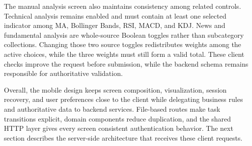 The manual analysis screen also maintains consistency among related controls. Technical analysis remains enabled and must contain at least one selected indicator among MA, Bollinger Bands, RSI, MACD, and KDJ. News and fundamental analysis are whole-source Boolean toggles rather than subcategory collections. Changing those two source toggles redistributes weights among the active choices, while the three weights must still form a valid total. These client checks improve the request before submission, while the backend schema remains responsible for authoritative validation.

Overall, the mobile design keeps screen composition, visualization, session recovery, and user preferences close to the client while delegating business rules and authoritative data to backend services. File-based routes make task transitions explicit, domain components reduce duplication, and the shared HTTP layer gives every screen consistent authentication behavior. The next section describes the server-side architecture that receives these client requests.
